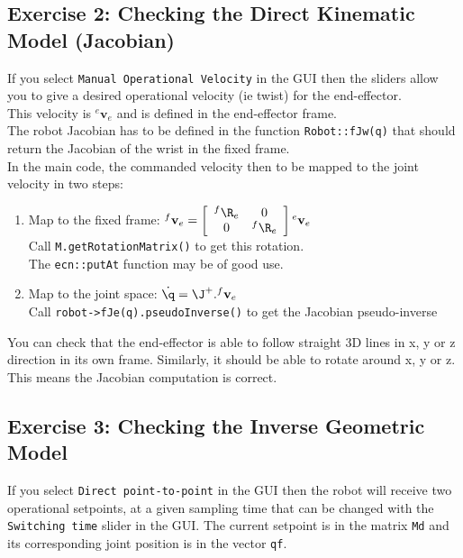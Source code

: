 \documentclass{ecnreport}
\begin{document}
\subsection*{Exercise 2: Checking the Direct Kinematic Model (Jacobian)}

If you select \texttt{Manual Operational Velocity} in the GUI then the sliders allow you to give a desired operational velocity (ie twist) for the end-effector.\\
This velocity is ${}^e\mathbf{v}_e$ and is defined in the end-effector frame.\\
The robot Jacobian has to be defined in the function \texttt{Robot::fJw(q)} that should return the Jacobian of the wrist in the fixed frame.\\


In the main code, the commanded velocity then to be mapped to the joint velocity in two steps:
\begin{enumerate}
	\item Map to the fixed frame: ${}^f\mathbf{v}_e = \left[\begin{array}{cc}{}^f\R_e & 0 \\ 0 & {}^f\R_e\end{array}\right]{}^e\mathbf{v}_e$\\
			Call \texttt{M.getRotationMatrix()} to get this rotation.\\
			The \texttt{ecn::putAt} function may be of good use.
	\item Map to the joint space: $\dot\q = \J^+.{}^f\mathbf{v}_e$\\
Call \texttt{robot->fJe(q).pseudoInverse()} to get the Jacobian pseudo-inverse
\end{enumerate}
You can check that the end-effector is able to follow straight 3D lines in x, y or z direction in its own frame.
Similarly, it should be able to rotate around x, y or z. This means the Jacobian computation is correct.

\newpage
\subsection*{Exercise 3: Checking the Inverse Geometric Model}

If you select \texttt{Direct point-to-point} in the GUI then the robot will receive two operational setpoints, at a given sampling time that can be changed with the \texttt{Switching time} slider in the GUI. The current setpoint is in the matrix \texttt{Md} and its corresponding joint position is in the vector \texttt{qf}. 
\end{document}
